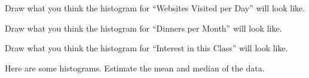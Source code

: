 \documentclass[answers,11pt]{exam}
\begin{document}
\begin{questions}
{%

\newpage


\question Draw what you think the histogram for ``Websites Visited per Day'' will look
like.

\begin{solution}
\end{solution}

\question Draw what you think the histogram for ``Dinners per Month'' will look
like.

\begin{solution}
\end{solution}


\question Draw what you think the histogram for ``Interest in this Class'' will look like.

\begin{solution}
\end{solution}



}

\newpage



\question Here are some histograms.  Estimate the mean and median of the data.

\end{questions}
\end{document}
